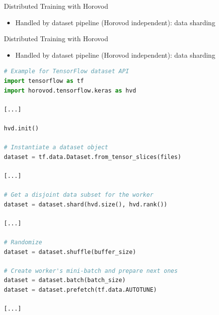 \begin{frame}{Distributed Training with Horovod}
\protect\hypertarget{distributed-training-with-horovod-3}{}

\begin{itemize}
\tightlist
\item
  Handled by dataset pipeline (Horovod independent): data sharding
\end{itemize}


\end{frame}

\begin{frame}[fragile]{Distributed Training with Horovod}
\protect\hypertarget{distributed-training-with-horovod-4}{}

\begin{itemize}
\tightlist
\item
  Handled by dataset pipeline (Horovod independent): data sharding
\end{itemize}

\begin{lstlisting}[language=Python]
# Example for TensorFlow dataset API
import tensorflow as tf
import horovod.tensorflow.keras as hvd

[...]

hvd.init()

# Instantiate a dataset object
dataset = tf.data.Dataset.from_tensor_slices(files)

[...]

# Get a disjoint data subset for the worker
dataset = dataset.shard(hvd.size(), hvd.rank())

[...]

# Randomize
dataset = dataset.shuffle(buffer_size)

# Create worker's mini-batch and prepare next ones
dataset = dataset.batch(batch_size)
dataset = dataset.prefetch(tf.data.AUTOTUNE)

[...]
\end{lstlisting}

\end{frame}

